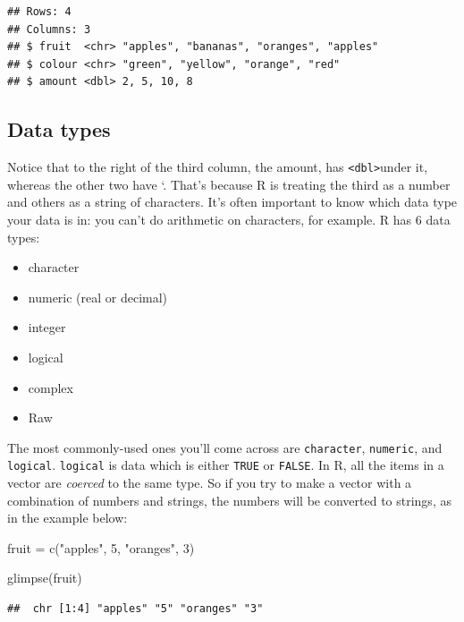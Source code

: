 \documentclass[
]{book}
\newenvironment{Shaded}{\begin{snugshade}}{\end{snugshade}}
\newcommand{\DecValTok}[1]{\textcolor[rgb]{0.00,0.00,0.81}{#1}}
\newcommand{\FunctionTok}[1]{\textcolor[rgb]{0.00,0.00,0.00}{#1}}
\newcommand{\NormalTok}[1]{#1}
\newcommand{\OtherTok}[1]{\textcolor[rgb]{0.56,0.35,0.01}{#1}}
\newcommand{\StringTok}[1]{\textcolor[rgb]{0.31,0.60,0.02}{#1}}
\providecommand{\tightlist}{%
  \setlength{\itemsep}{0pt}\setlength{\parskip}{0pt}}
\begin{document}
\begin{verbatim}
## Rows: 4
## Columns: 3
## $ fruit  <chr> "apples", "bananas", "oranges", "apples"
## $ colour <chr> "green", "yellow", "orange", "red"
## $ amount <dbl> 2, 5, 10, 8
\end{verbatim}

\hypertarget{data-types}{%
\subsection{Data types}\label{data-types}}

Notice that to the right of the third column, the amount, has \texttt{\textless{}dbl\textgreater{}}under it, whereas the other two have `. That's because R is treating the third as a number and others as a string of characters. It's often important to know which data type your data is in: you can't do arithmetic on characters, for example. R has 6 data types:

\begin{itemize}
\tightlist
\item
  character
\item
  numeric (real or decimal)
\item
  integer
\item
  logical
\item
  complex
\item
  Raw
\end{itemize}

The most commonly-used ones you'll come across are \texttt{character}, \texttt{numeric}, and \texttt{logical}. \texttt{logical} is data which is either \texttt{TRUE} or \texttt{FALSE}. In R, all the items in a vector are \emph{coerced} to the same type. So if you try to make a vector with a combination of numbers and strings, the numbers will be converted to strings, as in the example below:

\begin{Shaded}
\begin{Highlighting}[]
\NormalTok{fruit }\OtherTok{=} \FunctionTok{c}\NormalTok{(}\StringTok{"apples"}\NormalTok{, }\DecValTok{5}\NormalTok{, }\StringTok{"oranges"}\NormalTok{, }\DecValTok{3}\NormalTok{)}

\FunctionTok{glimpse}\NormalTok{(fruit)}
\end{Highlighting}
\end{Shaded}

\begin{verbatim}
##  chr [1:4] "apples" "5" "oranges" "3"
\end{verbatim}
\end{document}
